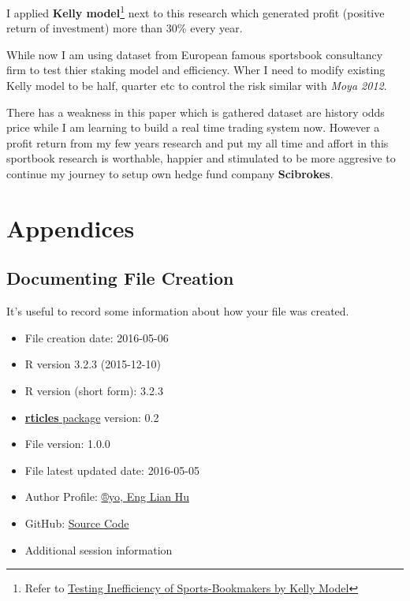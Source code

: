 \documentclass[article]{jss}
\providecommand{\tightlist}{%
  \setlength{\itemsep}{0pt}\setlength{\parskip}{0pt}}
\begin{document}
I applied \textbf{Kelly model}\footnote{Refer to
  \href{https://github.com/Scibrokes/Kelly-Criterion}{Testing
  Inefficiency of Sports-Bookmakers by Kelly Model}} next to this
research which generated profit (positive return of investment) more
than 30\% every year. \bigbreak

While now I am using dataset from European famous sportsbook consultancy
firm to test thier staking model and efficiency. Wher I need to modify
existing Kelly model to be half, quarter etc to control the risk similar
with \emph{Moya 2012}. \bigbreak

There has a weakness in this paper which is gathered dataset are history
odds price while I am learning to build a real time trading system now.
However a profit return from my few years research and put my all time
and affort in this sportbook research is worthable, happier and
stimulated to be more aggresive to continue my journey to setup own
hedge fund company \textbf{Scibrokes}.

\section{Appendices}\label{appendices}

\subsection{Documenting File Creation}\label{documenting-file-creation}

It's useful to record some information about how your file was created.

\begin{itemize}
\tightlist
\item
  File creation date: 2016-05-06
\item
  R version 3.2.3 (2015-12-10)
\item
  R version (short form): 3.2.3
\item
  \href{https://github.com/rstudio/rticles}{\textbf{rticles} package}
  version: 0.2
\item
  File version: 1.0.0
\item
  File latest updated date: 2016-05-05
\item
  Author Profile:
  \href{https://beta.rstudioconnect.com/englianhu/ryo-eng/}{®yo, Eng
  Lian Hu}
\item
  GitHub:
  \href{https://github.com/scibrokes/odds-modelling-and-testing-inefficiency-of-sports-bookmakers}{Source
  Code}
\item
  Additional session information
\end{itemize}
\end{document}

